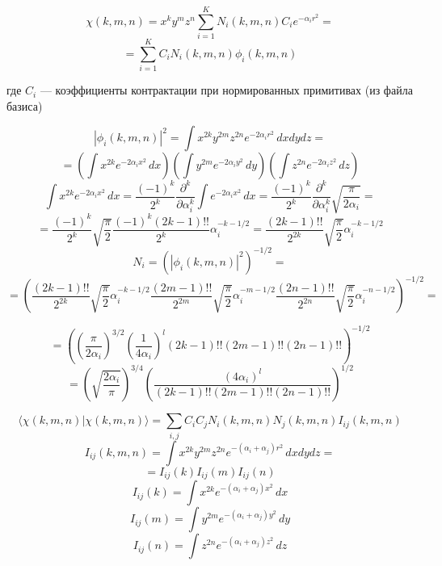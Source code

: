 \documentclass[a4paper,14pt]{extarticle}
\begin{document}
\begin{enumerate}
$$ \chi(k,m,n) = x^ky^mz^n\sum_{i = 1} ^ K N_i(k,m,n)  C_ie^{-\alpha_ir^2} = $$
$$ =\sum_{i=1}^K C_i N_i(k,m,n)\phi_i(k,m,n) $$

где $C_i$ --- коэффициенты контрактации при нормированных примитивах (из файла базиса)

$$|\phi_i(k,m,n)|^2 = \int x^{2k}y^{2m}z^{2n} e^{-2\alpha_ir^2}\,dxdydz = $$
$$ = \left( \int x^{2k} e^{-2\alpha_i x^2}\,dx \right)\left( \int y^{2m} e^{-2\alpha_i y^2}\,dy \right)\left( \int z^{2n} e^{-2\alpha_i z^2}\,dz \right)$$
$$ \int x^{2k} e^{-2\alpha_i x^2}\,dx = \frac{(-1)^k}{2^k}\frac{\partial^k}{\partial\alpha_i^k}\int e^{-2\alpha_i x^2}\, dx = \frac{(-1)^k}{2^k}\frac{\partial^k}{\partial\alpha_i^k}%
				 \sqrt{\frac{\pi}{2\alpha_i}} =$$
$$ = \frac{(-1)^k}{2^k}\sqrt{\frac{\pi}{2}}\frac{(-1)^k(2k-1)!!}{2^k}\alpha_i^{-k-1/2} = \frac{(2k-1)!!}{2^{2k}}\sqrt{\frac{\pi}{2}}\alpha_i^{-k-1/2}$$
$$N_i = \left( |\phi_i(k,m,n)|^2 \right)^{-1/2} = $$ 
$$ = \left(%
	    \frac{(2k-1)!!}{2^{2k}}\sqrt{\frac{\pi}{2}}\alpha_i^{-k-1/2} %
	    \frac{(2m-1)!!}{2^{2m}}\sqrt{\frac{\pi}{2}}\alpha_i^{-m-1/2} %
	    \frac{(2n-1)!!}{2^{2n}}\sqrt{\frac{\pi}{2}}\alpha_i^{-n-1/2} %
	    \right)^{-1/2} = $$

$$ = \left( \left( \frac{\pi}{2\alpha_i}\right)^{3/2} \left(\frac{1}{4\alpha_i}\right)^{l}(2k-1)!!(2m-1)!!(2n-1)!! \right)^{-1/2} $$
$$ = \left(\sqrt{ \frac{2\alpha_i}{\pi} } \right)^{3/4}\left(\frac{(4\alpha_i)^l}{(2k-1)!!(2m-1)!!(2n-1)!!}\right)^{1/2}$$


$$\langle\chi(k,m,n)|\chi(k,m,n)\rangle = %
	 \sum_{i,j}C_iC_j N_i(k,m,n)N_j(k,m,n) I_{ij}(k,m,n)$$
$$I_{ij}(k,m,n) = \int x^{2k}y^{2m}z^{2n}e^{-(\alpha_i+\alpha_j)r^2}\,dxdydz = $$
$$ = I_{ij}(k)I_{ij}(m)I_{ij}(n)$$
$$ I_{ij}(k) = \int x^{2k}e^{-(\alpha_i+\alpha_j)x^2}\,dx$$
$$ I_{ij}(m) = \int y^{2m}e^{-(\alpha_i+\alpha_j)y^2}\,dy$$
$$ I_{ij}(n) = \int z^{2n}e^{-(\alpha_i+\alpha_j)z^2}\,dz$$


\end{enumerate}
\end{document}
